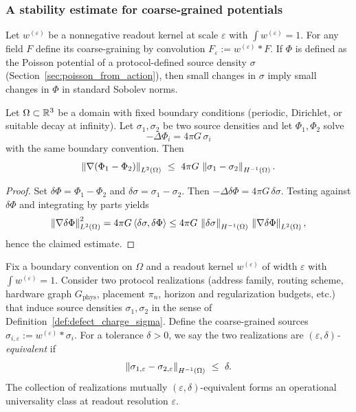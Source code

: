 \subsubsection{A stability estimate for coarse-grained potentials}
\label{sec:potential_stability}

Let $w^{(\varepsilon)}$ be a nonnegative readout kernel at scale $\varepsilon$ with $\int w^{(\varepsilon)}=1$.
For any field $F$ define its coarse-graining by convolution $F_\varepsilon:=w^{(\varepsilon)}\ast F$.
If $\Phi$ is defined as the Poisson potential of a protocol-defined source density $\sigma$ (Section~\ref{sec:poisson_from_action}), then small changes in $\sigma$ imply small changes in $\Phi$ in standard Sobolev norms.

\begin{proposition}
\label{prop:poisson_stability}
Let $\Omega\subset\mathbb{R}^3$ be a domain with fixed boundary conditions (periodic, Dirichlet, or suitable decay at infinity).
Let $\sigma_1,\sigma_2$ be two source densities and let $\Phi_1,\Phi_2$ solve
\[
-\Delta\Phi_i=4\pi G\,\sigma_i
\]
with the same boundary convention.
Then
\[
\norm{\nabla(\Phi_1-\Phi_2)}_{L^2(\Omega)}\ \le\ 4\pi G\,\norm{\sigma_1-\sigma_2}_{H^{-1}(\Omega)}.
\]
\end{proposition}

\begin{proof}
Set $\delta\Phi=\Phi_1-\Phi_2$ and $\delta\sigma=\sigma_1-\sigma_2$.
Then $-\Delta\delta\Phi=4\pi G\,\delta\sigma$.
Testing against $\delta\Phi$ and integrating by parts yields
\[
\left\lVert \nabla\delta\Phi\right\rVert_{L^2(\Omega)}^2
=4\pi G\,\langle \delta\sigma,\delta\Phi\rangle
\le 4\pi G\,\left\lVert \delta\sigma\right\rVert_{H^{-1}(\Omega)}\,\left\lVert \nabla\delta\Phi\right\rVert_{L^2(\Omega)},
\]
hence the claimed estimate.
\end{proof}

\begin{definition}
\label{def:eps_universality_class}
Fix a boundary convention on $\Omega$ and a readout kernel $w^{(\varepsilon)}$ of width $\varepsilon$ with $\int w^{(\varepsilon)}=1$.
Consider two protocol realizations (address family, routing scheme, hardware graph $G_{\mathrm{phys}}$, placement $\pi_n$, horizon and regularization budgets, etc.) that induce source densities $\sigma_1,\sigma_2$ in the sense of Definition~\ref{def:defect_charge_sigma}.
Define the coarse-grained sources $\sigma_{i,\varepsilon}:=w^{(\varepsilon)}\ast\sigma_i$.
For a tolerance $\delta>0$, we say the two realizations are \emph{$(\varepsilon,\delta)$-equivalent} if
\[
\norm{\sigma_{1,\varepsilon}-\sigma_{2,\varepsilon}}_{H^{-1}(\Omega)}\ \le\ \delta.
\]
The collection of realizations mutually $(\varepsilon,\delta)$-equivalent forms an operational universality class at readout resolution $\varepsilon$.
\end{definition}

